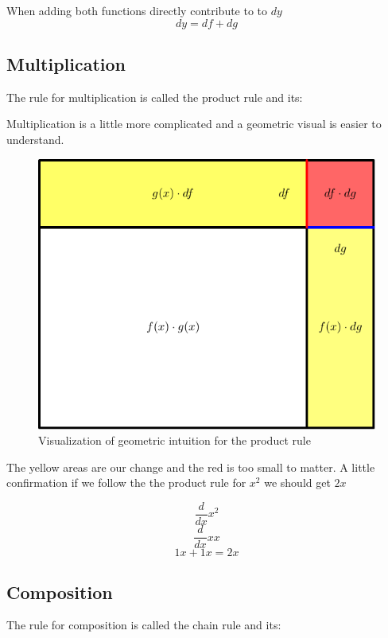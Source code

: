\documentclass[12pt]{book}
\begin{document}
When adding both functions directly contribute to to $dy$
%    
%    
%    
%
$$dy=df+dg$$

\subsection{Multiplication}
The rule for multiplication is called the product rule and its:
\begin{center}
\end{center}

Multiplication is a little more complicated and a geometric visual is easier to understand.


\begin{figure}[h]
    \centering
		\includegraphics{./figures/4.1.pdf}
    \caption{Visualization of geometric intuition for the product rule}
\end{figure}
The yellow areas are our change and the red is too small to matter.
A little confirmation if we follow the the product rule for $x^2$ we should get $2x$

$$\frac{d}{dx}x^2$$
$$\frac{d}{dx}xx$$
$$1x + 1x = 2x$$

\subsection{Composition}
The rule for composition is called the chain rule and its:
\begin{center}
\end{center}
\end{document}
